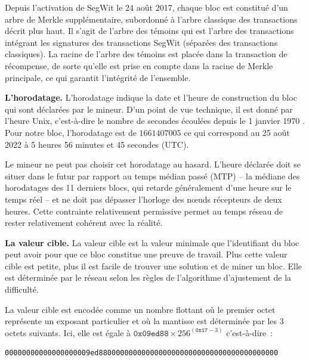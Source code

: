 Depuis l'activation de SegWit le 24 août 2017, chaque bloc est constitué d'un arbre de Merkle supplémentaire, subordonné à l'arbre classique des transactions décrit plus haut. Il s'agit de l'arbre des témoins qui est l'arbre des transactions intégrant les signatures des transactions SegWit (séparées des transactions classiques). La racine de l'arbre des témoins est placée dans la transaction de récompense, de sorte qu'elle est prise en compte dans la racine de Merkle principale, ce qui garantit l'intégrité de l'ensemble.


\textbf{L'horodatage.} L'horodatage indique la date et l'heure de construction du bloc qui sont déclarées par le mineur. D'un point de vue technique, il est donné par l'heure Unix, c'est-à-dire le nombre de secondes écoulées depuis le 1\ier{} janvier 1970 . Pour notre bloc, l'horodatage est de $1661407005$ ce qui correspond au 25 août 2022 à 5 heures 56 minutes et 45 secondes (UTC).

Le mineur ne peut pas choisir cet horodatage au hasard. L'heure déclarée doit se situer dans le futur par rapport au temps médian passé (MTP) -- la médiane des horodatages des 11 derniers blocs, qui retarde généralement d'une heure sur le temps réel -- et ne doit pas dépasser l'horloge des nœuds récepteurs de deux heures. Cette contrainte relativement permissive permet au temps réseau de rester relativement cohérent avec la réalité.


\textbf{La valeur cible.} La valeur cible est la valeur minimale que l'identifiant du bloc peut avoir pour que ce bloc constitue une preuve de travail. Plus cette valeur cible est petite, plus il est facile de trouver une solution et de miner un bloc. Elle est déterminée par le réseau selon les règles de l'algorithme d'ajustement de la difficulté.

La valeur cible est encodée comme un nombre flottant où le premier octet représente un exposant particulier et où la mantisse est déterminée par les 3 octets suivants. Ici, elle est égale à $\mathtt{0x09ed88} \times 256^{(\mathtt{0x17} - 3)}$ c'est-à-dire~:

\begin{Verbatim}[fontsize=\footnotesize]
00000000000000000009ed880000000000000000000000000000000000000000
\end{Verbatim}

